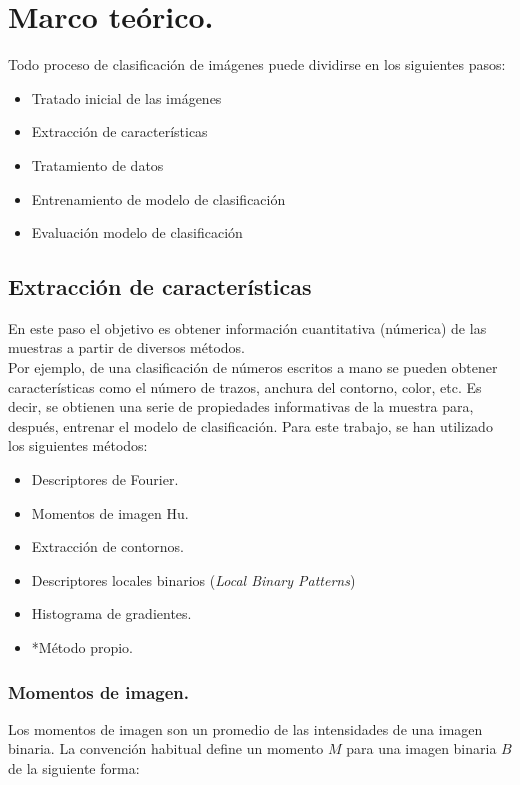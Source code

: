 \chapter{Marco teórico.}

Todo proceso de clasificación de imágenes puede dividirse en los siguientes pasos:

\begin{itemize}
	\item Tratado inicial de las imágenes
	\item Extracción de características
	\item Tratamiento de datos
	\item Entrenamiento de modelo de clasificación
	\item Evaluación modelo de clasificación
\end{itemize}

\section{Extracción de características}

En este paso el objetivo es obtener información cuantitativa (númerica) de las muestras a partir de diversos métodos.\\ Por ejemplo, de una clasificación de números escritos a mano se pueden obtener características como el número de trazos, anchura del contorno, color, etc. Es decir, se obtienen una serie de propiedades informativas de la muestra para, después, entrenar el modelo de clasificación. 
\linebreak
Para este trabajo, se han utilizado los siguientes métodos:
\begin{itemize}
	\item Descriptores de Fourier.
	\item Momentos de imagen Hu.
	\item Extracción de contornos.
	\item Descriptores locales binarios (\textit{Local Binary Patterns})
	\item Histograma de gradientes.
	\item *Método propio.
\end{itemize}

\subsection{Momentos de imagen.}

Los momentos de imagen son un promedio de las intensidades de una imagen binaria. La convención habitual define un momento \(M\) para una imagen binaria \(B\) de la siguiente forma:

